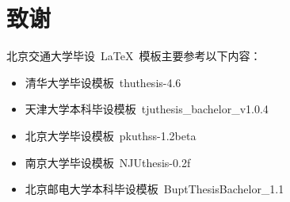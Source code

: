 \chapter*{致谢}
北京交通大学毕设~\LaTeX{}~模板主要参考以下内容：
\begin{itemize}
  \item 清华大学毕设模板~thuthesis-4.6~
  \item 天津大学本科毕设模板~tjuthesis\_bachelor\_v1.0.4~
  \item 北京大学毕设模板~pkuthss-1.2beta~
  \item 南京大学毕设模板~NJUthesis-0.2f~
  \item 北京邮电大学本科毕设模板~BuptThesisBachelor\_1.1~
\end{itemize}
